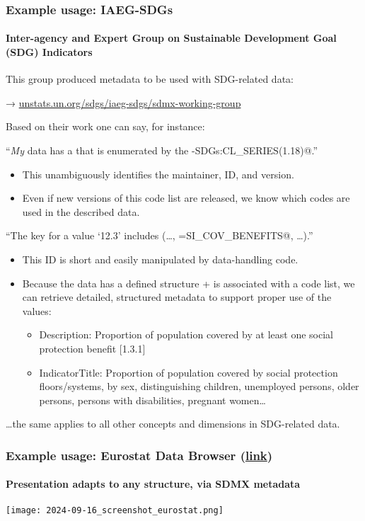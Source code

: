 \documentclass[12pt,aspectratio=169]{beamer}
\begin{document}
\begin{frame}
\frametitle{Example usage: IAEG-SDGs}
\framesubtitle{Inter-agency and Expert Group on Sustainable Development Goal (SDG) Indicators}

This group produced metadata to be used with SDG-related data:

→ \href{https://unstats.un.org/sdgs/iaeg-sdgs/sdmx-working-group/}{unstats.un.org/sdgs/iaeg-sdgs/sdmx-working-group}

\bigskip
Based on their work one can say, for instance:

\medskip
“\emph{My} data has a  \verb@SERIES@ that is enumerated by the  \verb@IAEG-SDGs:CL_SERIES(1.18)@.”
\begin{itemize}
  \item This unambiguously identifies the maintainer, ID, and version.
  \item Even if new versions of this code list are released, we know which codes are used in the described data.
\end{itemize}

\framebreak
\medskip
“The key for a value ‘12.3’ includes (…, \verb@SERIES=SI_COV_BENEFITS@, …).”
\begin{itemize}
  \item This ID is short and easily manipulated by data-handling code.
  \item Because the data has a defined structure + is associated with a code list, we can retrieve detailed, structured metadata to support proper use of the values:
  \begin{itemize}
    \item Description: Proportion of population covered by at least one social protection benefit [1.3.1]
    \item IndicatorTitle: Proportion of population covered by social protection floors/systems, by sex, distinguishing children, unemployed persons, older persons, persons with disabilities, pregnant women…
  \end{itemize}
\end{itemize}
…the same applies to all other concepts and dimensions in SDG-related data.
\end{frame}

\begin{frame}
\frametitle{Example usage: Eurostat Data Browser (\href{https://ec.europa.eu/eurostat/databrowser/product/view/avia_if_typ?lang=en}{link})}
\framesubtitle{Presentation adapts to \textbf{any} structure, via SDMX metadata}
\texttt{[image: 2024-09-16\_screenshot\_eurostat.png]}
\end{frame}
\end{document}
